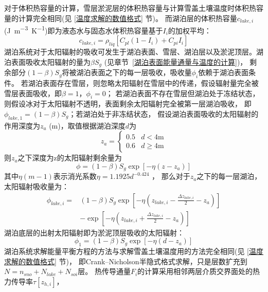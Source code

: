 对于体积热容量的计算，雪层淤泥层的体积热容量与计算雪盖土壤温度时体积热容量的计算完全相同(见 \ref{温度求解的数值格式} 节)。
而湖泊层的体积热容量$c_{lake,i}$ (\unit{J.m^{-3}.K^{-1}})即为液态水与固态水体积热容量基于$I_i$的加权平均：
\begin{equation}
c_{lake, i}=\rho_{liq}\left[C_{p l}\left(1-I_{i}\right)+C_{p i} I_{i}\right]
\end{equation}
湖泊系统对于太阳辐射的吸收可发生于湖泊表面、雪层、湖泊层以及淤泥顶层。湖泊表面吸收太阳辐射的量为$\beta S_g$ (见章节~\ref{湖泊表面能量通量与温度的计算})，
剩余部分$\left(1-\beta\right)S_g$将被湖泊表面之下的每一层吸收，吸收量$\phi_i$依赖于湖泊表面条件。
若湖泊表面存在雪层，则忽略太阳辐射在雪层中的传递，假设辐射量完全被雪层表面吸收，即$\beta=1$，$\phi_i=0$；
若湖泊表面不存在雪层但湖泊处于冻结状态，则假设冰对于太阳辐射不透明，表面剩余太阳辐射完全被第一层湖泊吸收，
即$\phi_{lake,1}=\left(1-\beta\right)S_g$；若湖泊处于非冻结状态，
假设湖泊表面吸收的太阳辐射的作用深度为$z_a$ (m)，取值根据湖泊深度$d$为
\begin{equation}
z_{a}=\left\{\begin{array}{ll}0.5 & d<4 \text{m} \\ 0.6 & d \geqslant 4 \text{m}\end{array}\right.
\end{equation}
则$z_a$之下深度为z的太阳辐射剩余量为
\begin{equation}
\phi=(1-\beta) S_{g} \exp \left[-\eta\left(z-z_{a}\right)\right]
\end{equation}
其中$\eta(m-1)$表示消光系数$\eta=1.1925d^{-0.424}$ \citep{subin2012improved}，
那么对于$z_a$之下的每一层湖泊，太阳辐射吸收量为：
\begin{equation}
\begin{split}
    \phi_{lake, i}= & (1-\beta) S_{g} \exp \left[-\eta\left(z_{lake, i}-\frac{\Delta z_{lake, i}}{2}-z_{a}\right)\right] \\
     & -\exp \left[-\eta\left(z_{lake, i}+\frac{\Delta z_{lake, i}}{2}-z_{a}\right)\right]
\end{split}
\end{equation}
湖泊底层的出射太阳辐射即为淤泥顶层吸收的太阳辐射：
\begin{equation}
\phi_{1}=(1-\beta) S_{g} \exp \left[-\eta\left(d-z_{a}\right)\right]
\end{equation}
湖泊系统求解能量平衡方程的方法与求解雪盖土壤温度用的方法完全相同(见 \ref{温度求解的数值格式} 节)，
即Crank--Nicholson半隐式格式求解，只是层数扩充到$N=n_{sno}+N_{lake}+N_{soi}$层。
热传导通量$F_i$的计算采用相邻两层介质交界面处的热力传导率$\tau\left[z_{h,i}\right]$，
